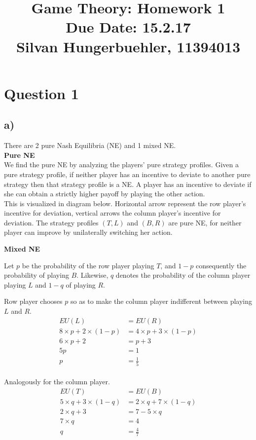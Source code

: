 \documentclass[10pt,a4paper]{article}
\title{%
  Game Theory: Homework 1 \\
  \large Due Date: 15.2.17\\
  \large Silvan Hungerbuehler, 11394013}
\date{}
\begin{document}
\maketitle

\section*{Question 1}
\subsection*{a)}
There are 2 pure Nash Equilibria (NE) and 1 mixed NE.\\
\textbf{Pure NE}\\
We find the pure NE by analyzing the players' pure strategy profiles. Given a pure strategy profile, if neither player has  an incentive to deviate to another pure strategy then that strategy profile is a NE. A player has an incentive to deviate if she can obtain a strictly higher payoff by playing the other action.\\
This is visualized in diagram below. Horizontal arrow represent the row player's incentive for deviation, vertical arrows the column player's incentive for deviation. The strategy profiles $(T,L)$ and $(B,R)$ are pure NE, for neither player can improve by unilaterally switching her action.

\textbf{Mixed NE}

Let $p$ be the probability of the row player playing $T$, and $1-p$ consequently the probability of playing $B$. Likewise, $q$ denotes the probability of the column player  playing $L$ and $1-q$ of playing $R$.

Row player chooses $p$ so as to make the column player indifferent between playing $L$ and $R$.\\
\begin{align*}
EU(L)&=EU(R)\\
8\times p + 2\times (1-p)&= 4\times p + 3\times (1-p) \\
6\times p + 2 &= p+3 \\
5p &= 1 \\
p &= \tfrac{1}{5}
\end{align*}\\
Analogously for the column player.\\
\begin{align*}
EU(T)&=EU(B)\\
5\times q + 3\times (1-q)&= 2\times q + 7\times (1-q) \\
2\times q + 3 &= 7-5\times q \\
7\times q &= 4 \\
q &= \tfrac{4}{7}
\end{align*}
\end{document}
